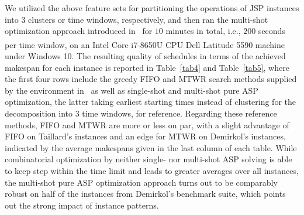 \documentclass[runningheads]{llncs}
\begin{document}
We utilized the above feature sets for partitioning the operations of JSP instances into $3$ clusters or time windows, respectively,
and then ran the multi-shot optimization approach introduced in~\cite{el2020job} for
$10$ minutes in total, i.e., $200$ seconds per time window,
on an
Intel\textsuperscript{\textregistered} Core\texttrademark{} i7-8650U CPU %
Dell Latitude 5590 machine under Windows 10.
%
The resulting quality of schedules in terms of the achieved makespan for each instance is reported in Table~\ref{tab4} and Table~\ref{tab5},
where the first four rows include the greedy FIFO and MTWR search methods supplied by the environment in~\cite{tagesc21a}
as well as single-shot and multi-shot pure ASP optimization, the latter taking earliest starting times instead of 
clustering for the decomposition into $3$ time windows,
for reference.
%
Regarding these reference methods, FIFO and MTWR are more or less on par, with a slight advantage of FIFO on Taillard's instances and an edge for MTWR on Demirkol's instances, 
indicated
by the average makespans given in the last column of each table.
While combinatorial optimization by neither single- nor multi-shot ASP 
solving is able to keep step within the time limit and leads to greater averages over all instances, the multi-shot pure ASP optimization approach turns out to be comparably robust
on half of the instances from Demirkol's benchmark suite,
which points out the strong impact of instance patterns.
%
\end{document}
